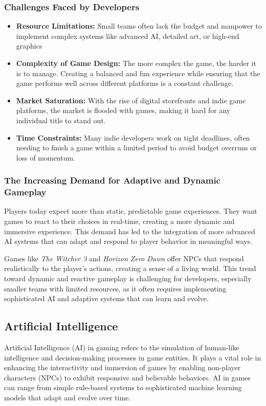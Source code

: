 \documentclass[12pt,oneside,openright,a4paper]{cpe-english-project}
\begin{document}
\subsubsection{Challenges Faced by Developers}
\begin{itemize}
\item  \textbf{Resource Limitations:}
Small teams often lack the budget and manpower to implement complex systems like advanced AI, detailed art, or high-end graphics
\item  \textbf{Complexity of Game Design:}
The more complex the game, the harder it is to manage. Creating a balanced and fun experience while ensuring that the game performs well across different platforms is a constant challenge.
\item  \textbf{Market Saturation:}
With the rise of digital storefronts and indie game platforms, the market is flooded with games, making it hard for any individual title to stand out.
\item  \textbf{Time Constraints:}
Many indie developers work on tight deadlines, often needing to finish a game within a limited period to avoid budget overruns or loss of momentum.
\end{itemize}
\subsubsection{The Increasing Demand for Adaptive and Dynamic Gameplay}
Players today expect more than static, predictable game experiences. They want games to react to their choices in real-time, creating a more dynamic and immersive experience\cite{apnews_ai_npc}. This demand has led to the integration of more advanced AI systems that can adapt and respond to player behavior in meaningful ways.\par
Games like \emph{The Witcher 3}\cite{medium_witcher3_ai} and \emph{Horizon Zero Dawn}\cite{aiandgames_horizon} offer NPCs that respond realistically to the player’s actions, creating a sense of a living world. This trend toward dynamic and reactive gameplay is challenging for developers, especially smaller teams with limited resources, as it often requires implementing sophisticated AI and adaptive systems that can learn and evolve.

\subsection{Artificial Intelligence}
Artificial Intelligence (AI) \cite{fpgainsights_adaptive_ai}in gaming refers to the simulation of human-like intelligence and decision-making processes in game entities. It plays a vital role in enhancing the interactivity and immersion of games by enabling non-player characters (NPCs) to exhibit responsive and believable behaviors. AI in games can range from simple rule-based systems to sophisticated machine learning models that adapt and evolve over time.
\end{document}
